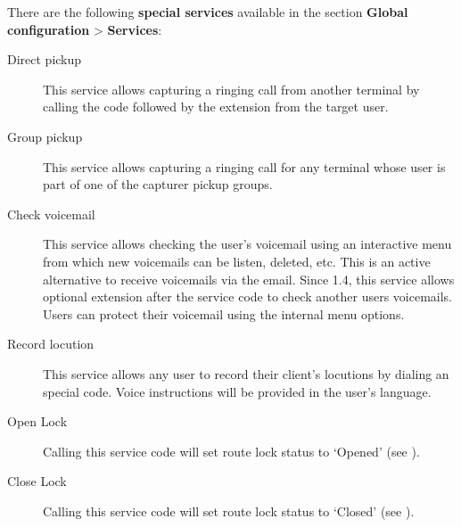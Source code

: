 \documentclass[letterpaper,10pt,spanish]{sphinxmanual}
\begin{document}
There are the following \textbf{special services} available in the section \textbf{Global
configuration} \textgreater{} \textbf{Services}:
\begin{description}
\item[{Direct pickup}] \leavevmode{}\label{administration_portal/platform/services:term-direct-pickup}
This service allows capturing a ringing call from another terminal by
calling the code followed by the extension from the target user.

\item[{Group pickup}] \leavevmode{}\label{administration_portal/platform/services:term-group-pickup}
This service allows capturing a ringing call for any terminal whose user
is part of one of the capturer pickup groups.

\item[{Check voicemail}] \leavevmode{}\label{administration_portal/platform/services:term-check-voicemail}
This service allows checking the user's voicemail using an interactive
menu from which new voicemails can be listen, deleted, etc. This is an
active alternative to receive voicemails via the email. Since 1.4, this
service allows optional extension after the service code to check
another users voicemails. Users can protect their voicemail using the
internal menu options.

\item[{Record locution}] \leavevmode{}\label{administration_portal/platform/services:term-record-locution}
This service allows any user to record their client's locutions by
dialing an special code. Voice instructions will be provided in the
user's language.

\item[{Open Lock}] \leavevmode{}\label{administration_portal/platform/services:term-open-lock}
Calling this service code will set route lock status to `Opened' (see {\hyperref[administration_portal/client/vpbx/routing_tools/route_locks:route\string-locks]{}}).

\item[{Close Lock}] \leavevmode{}\label{administration_portal/platform/services:term-close-lock}
Calling this service code will set route lock status to `Closed' (see {\hyperref[administration_portal/client/vpbx/routing_tools/route_locks:route\string-locks]{}}).


\end{description}
\end{document}
